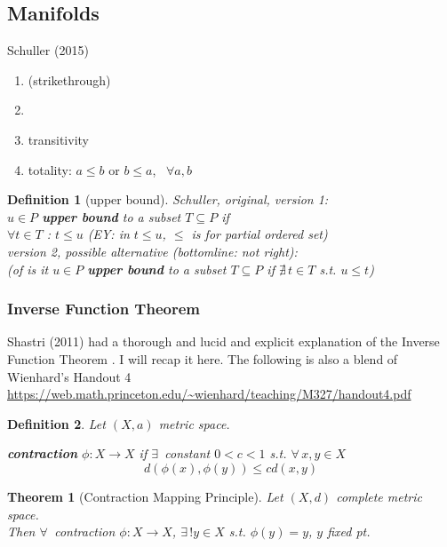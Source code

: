 \documentclass[10pt]{amsart}
\newtheorem{theorem}{Theorem}
\newtheorem{definition}{Definition}
\begin{document}
\begin{multicols*}{2}
\part{Manifolds}

Schuller (2015) \cite{Schu2015}

\begin{enumerate}
	\item (strikethrough)
	\item 
	\item transitivity
	\item totality: $a\leq b$ or $b\leq a$, \, $\forall a, b$
\end{enumerate}

\begin{definition}[upper bound]

Schuller, original, version 1: \\
$u \in P$ \textbf{upper bound} to a subset $T\subseteq P$ if \\
$\forall t \in T$ : $t\leq u$ (EY: in $t\leq u$, $\leq$ is for partial ordered set) \\

version 2, possible alternative (bottomline: not right): \\
(of is it $u\in P$ \textbf{upper bound} to a subset $T \subseteq P$ if $\nexists \, t\in T$ s.t. $u\leq t$)

\end{definition}


\section{Inverse Function Theorem}

Shastri (2011) had a thorough and lucid and explicit explanation of the Inverse Function Theorem \cite{AShastri2011}.  I will recap it here.  The following is also a blend of Wienhard's Handout 4 \url{https://web.math.princeton.edu/~wienhard/teaching/M327/handout4.pdf}

\begin{definition}
  Let $(X,a)$ metric space.  

\textbf{contraction} $\phi:X \to X$ if $\exists \, $ constant $0<c<1$ s.t. $\forall \, x,y \in X$
\[
d(\phi(x),\phi(y)) \leq cd(x,y)
\]
\end{definition}

\begin{theorem}[Contraction Mapping Principle]
  Let $(X,d)$ complete metric space.  \\
Then $\forall \, $ contraction $\phi:X\to X$, $\exists \, ! y\in X$ s.t. $\phi(y) = y$, $y$ \emph{fixed pt.}
\end{theorem}


\end{multicols*}
\end{document}
